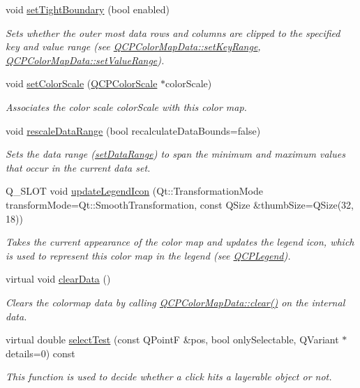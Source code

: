 \begin{DoxyCompactItemize}
void \hyperlink{classQCPColorMap_ad03221cc285e5f562a0b13d684b5576d}{set\+Tight\+Boundary} (bool enabled)
\begin{DoxyCompactList}\small\item\em Sets whether the outer most data rows and columns are clipped to the specified key and value range (see \hyperlink{classQCPColorMapData_a0738c485f3c9df9ea1241b7a8bb6a86e}{Q\+C\+P\+Color\+Map\+Data\+::set\+Key\+Range}, \hyperlink{classQCPColorMapData_ada1b2680ba96a5f4175b6d341cf75d23}{Q\+C\+P\+Color\+Map\+Data\+::set\+Value\+Range}). \end{DoxyCompactList}\item 
void \hyperlink{classQCPColorMap_aa828921db364fe3c6af4619580ab85fd}{set\+Color\+Scale} (\hyperlink{classQCPColorScale}{Q\+C\+P\+Color\+Scale} $\ast$color\+Scale)
\begin{DoxyCompactList}\small\item\em Associates the color scale {\itshape color\+Scale} with this color map. \end{DoxyCompactList}\item 
void \hyperlink{classQCPColorMap_a856608fa3dd1cc290bcd5f29a5575774}{rescale\+Data\+Range} (bool recalculate\+Data\+Bounds=false)
\begin{DoxyCompactList}\small\item\em Sets the data range (\hyperlink{classQCPColorMap_a980b42837821159786a85b4b7dcb8774}{set\+Data\+Range}) to span the minimum and maximum values that occur in the current data set. \end{DoxyCompactList}\item 
Q\+\_\+\+S\+L\+O\+T void \hyperlink{classQCPColorMap_a5d8158b62d55fcfeaabcb68ce0083e87}{update\+Legend\+Icon} (Qt\+::\+Transformation\+Mode transform\+Mode=Qt\+::\+Smooth\+Transformation, const Q\+Size \&thumb\+Size=Q\+Size(32, 18))
\begin{DoxyCompactList}\small\item\em Takes the current appearance of the color map and updates the legend icon, which is used to represent this color map in the legend (see \hyperlink{classQCPLegend}{Q\+C\+P\+Legend}). \end{DoxyCompactList}\item 
virtual void \hyperlink{classQCPColorMap_a0545dce5383766885912331705a8e099}{clear\+Data} ()
\begin{DoxyCompactList}\small\item\em Clears the colormap data by calling \hyperlink{classQCPColorMapData_a9910ba830e96955bd5c8e5bef1e77ef3}{Q\+C\+P\+Color\+Map\+Data\+::clear()} on the internal data. \end{DoxyCompactList}\item 
virtual double \hyperlink{classQCPColorMap_a4088dc7bcbe9bba605c84a912ba660ff}{select\+Test} (const Q\+Point\+F \&pos, bool only\+Selectable, Q\+Variant $\ast$details=0) const 
\begin{DoxyCompactList}\small\item\em This function is used to decide whether a click hits a layerable object or not. \end{DoxyCompactList}\end{DoxyCompactItemize}
